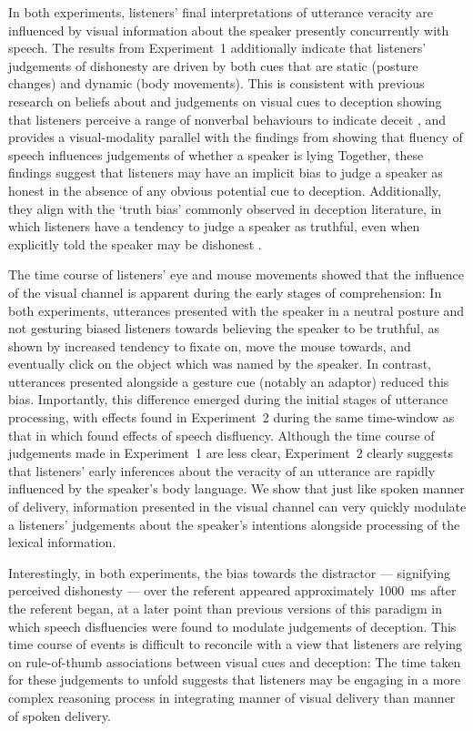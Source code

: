 \documentclass[a4paper,man,natbib]{apa6}
\begin{document}
In both experiments, listeners' final interpretations of utterance veracity are influenced by visual information about the speaker presently concurrently with speech.
The results from Experiment~1 additionally indicate that listeners' judgements of dishonesty are driven by both cues that are static (posture changes) and dynamic (body movements).
This is consistent with previous research on beliefs about and judgements on visual cues to deception showing that listeners perceive a range of nonverbal behaviours to indicate deceit \citep[e.g.][]{Zuckerman1981, Akehurst1996, Vrij2000}, and provides a visual-modality parallel with the findings from \citet{Loy2017} showing that fluency of speech influences judgements of whether a speaker is lying
Together, these findings suggest that listeners may have an implicit bias to judge a speaker as honest in the absence of any obvious potential cue to deception. 
Additionally, they align with the `truth bias' commonly observed in deception literature, in which listeners have a tendency to judge a speaker as truthful, even when explicitly told the speaker may be dishonest \citep{Vrij2000}.

The time course of listeners' eye and mouse movements showed that the influence of the visual channel is apparent during the early stages of comprehension:
In both experiments, utterances presented with the speaker in a neutral posture and not gesturing biased listeners towards believing the speaker to be truthful, as shown by increased tendency to fixate on, move the mouse towards, and eventually click on the object which was named by the speaker. 
In contrast, utterances presented alongside a gesture cue (notably an adaptor) reduced this bias.
Importantly, this difference emerged during the initial stages of utterance processing, with effects found in Experiment~2 during the same time-window as that in which \citet{Loy2017} found effects of speech disfluency.
Although the time course of judgements made in Experiment~1 are less clear, Experiment~2 clearly suggests that listeners' early inferences about the veracity of an utterance are rapidly influenced by the speaker's body language.
We show that just like spoken manner of delivery, information presented in the visual channel can very quickly modulate a listeners' judgements about the speaker's intentions alongside processing of the lexical information. 

Interestingly, in both experiments, the bias towards the distractor --- signifying perceived dishonesty --- over the referent appeared approximately 1000~ms after the referent began, at a later point than previous versions of this paradigm in which speech disfluencies were found to modulate judgements of deception. 
This time course of events is difficult to reconcile with a view that listeners are relying on rule-of-thumb associations between visual cues and deception: The time taken for these judgements to unfold suggests that listeners may be engaging in a more complex reasoning process in integrating manner of visual delivery than manner of spoken delivery. 
\end{document}
